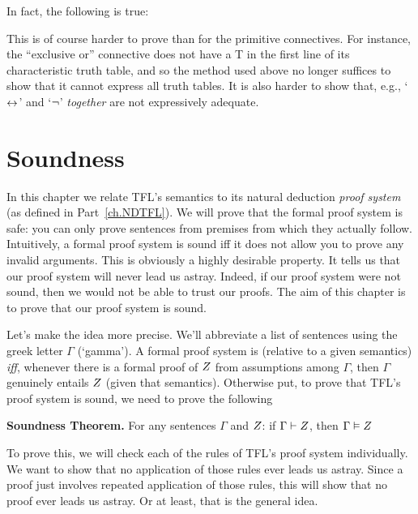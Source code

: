 In fact, the following is true:


This is of course harder to prove than for the primitive connectives. For instance, the ``exclusive or'' connective does not have a T in the first line of its characteristic truth table, and so the method used above no longer suffices to show that it cannot express all truth tables.  It is also harder to show that, e.g., `$\leftrightarrow$' and `$\neg$' \emph{together} are not expressively adequate.



\chapter{Soundness}\label{ch:Soundness}

In this chapter we relate TFL's semantics to its natural deduction \emph{proof system} (as defined in Part~\ref{ch.NDTFL}). We will prove that the formal proof system is safe: you can only prove sentences from premises from which they actually follow.
Intuitively, a formal proof system is sound iff it does not allow you to prove any invalid arguments. This is obviously a highly desirable property. It tells us that our proof system will never lead us astray. Indeed, if our proof system were not sound, then we would not be able to trust our proofs. The aim of this chapter is to prove that our proof system is sound.

Let's make the idea more precise. We'll abbreviate a list of sentences using the greek letter $\Gamma$ (`gamma'). A formal proof system is  (relative to a given semantics) \emph{iff}, whenever there is a formal proof of $Z$ from assumptions among $\Gamma$, then $\Gamma$ genuinely entails $Z$ (given that semantics). Otherwise put, to prove that TFL's proof system is sound, we need to prove the following

\begin{highlighted}\textbf{Soundness Theorem.} For any sentences $\Gamma$ and $Z$: if $\Gamma\vdash Z$, then $\Gamma \vDash Z$
\end{highlighted}

To prove this, we will check each of the rules of TFL's proof system individually. We want to show that no application of those rules ever leads us astray. Since a proof just involves repeated application of those rules, this will show that no proof ever leads us astray. Or at least, that is the general idea.

